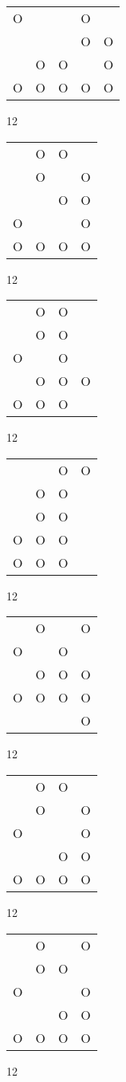 \begin{tabular}{|m{0.2cm}m{0.2cm}m{0.2cm}m{0.2cm}m{0.2cm}|}\hline
O& & &O& \\
 & & &O&O\\
 &O&O& &O\\
O&O&O&O&O\\
\hline\end{tabular}12
\begin{tabular}{|m{0.2cm}m{0.2cm}m{0.2cm}m{0.2cm}|}\hline
 &O&O& \\
 &O& &O\\
 & &O&O\\
O& & &O\\
O&O&O&O\\
\hline\end{tabular}12
\begin{tabular}{|m{0.2cm}m{0.2cm}m{0.2cm}m{0.2cm}|}\hline
 &O&O& \\
 &O&O& \\
O& &O& \\
 &O&O&O\\
O&O&O& \\
\hline\end{tabular}12
\begin{tabular}{|m{0.2cm}m{0.2cm}m{0.2cm}m{0.2cm}|}\hline
 & &O&O\\
 &O&O& \\
 &O&O& \\
O&O&O& \\
O&O&O& \\
\hline\end{tabular}12
\begin{tabular}{|m{0.2cm}m{0.2cm}m{0.2cm}m{0.2cm}|}\hline
 &O& &O\\
O& &O& \\
 &O&O&O\\
O&O&O&O\\
 & & &O\\
\hline\end{tabular}12
\begin{tabular}{|m{0.2cm}m{0.2cm}m{0.2cm}m{0.2cm}|}\hline
 &O&O& \\
 &O& &O\\
O& & &O\\
 & &O&O\\
O&O&O&O\\
\hline\end{tabular}12
\begin{tabular}{|m{0.2cm}m{0.2cm}m{0.2cm}m{0.2cm}|}\hline
 &O& &O\\
 &O&O& \\
O& & &O\\
 & &O&O\\
O&O&O&O\\
\hline\end{tabular}12
